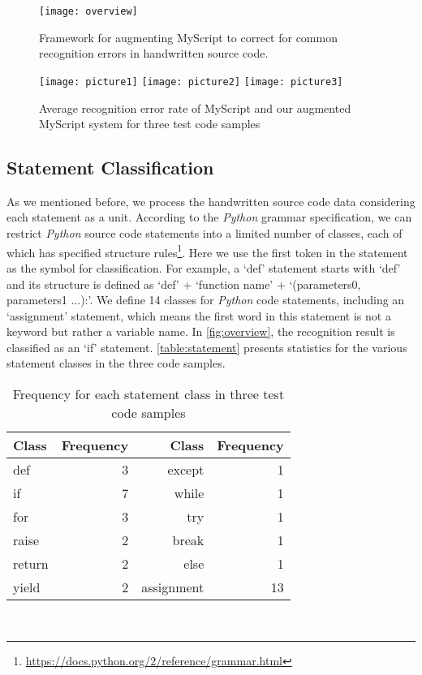 \documentclass{vgtc}                          %
\begin{document}
\begin{figure}[h!]
\centering
\texttt{[image: overview]}
\caption{Framework for augmenting MyScript to correct for common recognition errors in handwritten source code.}
\label{fig:overview}
\end{figure}

\begin{figure*}[h]
 \center
  \texttt{[image: picture1]}
  \texttt{[image: picture2]}
  \texttt{[image: picture3]}
  \caption{Average recognition error rate of MyScript and our augmented MyScript system for three test code samples}
  \label{result}
\end{figure*}



\subsection{Statement Classification}
As we mentioned before, we process the handwritten source code data considering each statement as a unit. According to the \textit{Python} grammar specification, we can restrict \textit{Python} source code statements into a limited number of classes, each of which has specified structure rules\footnote{\url{https://docs.python.org/2/reference/grammar.html}}. Here we use the first token in the statement as the symbol for classification. For example, a `def' statement starts with `def' and its structure is defined as `def' + `function name' + `(parameters0, parameters1 ...):'. We define 14 classes for \textit{Python} code statements, including an `assignment' statement, which means the first word in this statement is not a keyword but rather a variable name. In \autoref{fig:overview}, the recognition result is classified as an `if' statement. \autoref{table:statement} presents statistics for the various statement classes in the three code samples.



\begin{table}
  \centering
  \begin{tabular}{l r r r}
    {Class}
    & {Frequency}
      & {Class}
    & {Frequency} \\
    \midrule
    def & 3 & except & 1  \\
    if & 7 &  while & 1 \\
    for & 3  & try & 1 \\
    raise & 2 & break & 1 \\
    return & 2  & else & 1 \\
    yield & 2 & assignment & 13 \\
  \end{tabular}
  \caption{Frequency for each statement class in three test code samples}~\label{table:statement}
\end{table}
\end{document}
